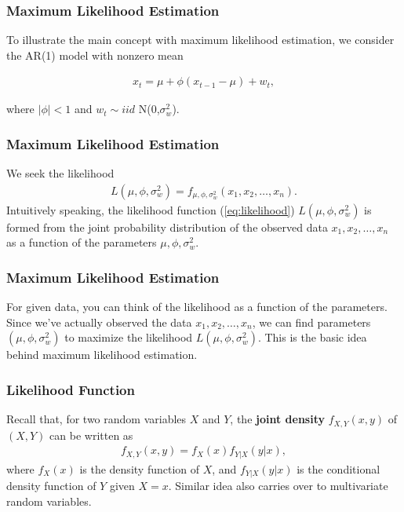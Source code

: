\documentclass[%
xcolor=pdftex]{beamer}
\begin{document}
\begin{frame}
\frametitle{Maximum Likelihood Estimation}

To illustrate the main concept with maximum likelihood estimation, we consider the AR(1) model with nonzero mean

\begin{eqnarray}\label{eq:ar1}
x_t=\mu+\phi(x_{t-1}-\mu)+w_t,
\end{eqnarray}

where $|\phi|<1$ and $w_t\sim iid $ N(0,$\sigma^2_w$).

\end{frame}

\begin{frame}
\frametitle{Maximum Likelihood Estimation}

We seek the likelihood
\begin{eqnarray}\label{eq:likelihood}
L(\mu,\phi,\sigma^2_w) = f_{\mu,\phi,\sigma^2_w}(x_1,x_2,\ldots,x_n).
\end{eqnarray}
Intuitively speaking, the likelihood function (\ref{eq:likelihood})
$L(\mu,\phi,\sigma^2_w)$ is formed from the joint probability distribution of the observed data $x_1,x_2,\ldots,x_n$ as a function of the parameters $\mu,\phi,\sigma^2_w$.

\end{frame}

\begin{frame}
\frametitle{Maximum Likelihood Estimation}

For given data, you can
think of the likelihood as a function of the parameters.
Since we've actually observed the data $x_1,x_2,\ldots,x_n$, we
can find parameters $(\mu,\phi,\sigma^2_w)$ to maximize the
likelihood $L(\mu,\phi,\sigma^2_w)$. This is the basic idea
behind maximum likelihood estimation.

\end{frame}


\begin{frame}
\frametitle{Likelihood Function}

Recall that, for two random variables $X$
and $Y$, the \textbf{joint density} $f_{X,Y}(x,y)$ of $(X,Y)$ can be
written as
\begin{eqnarray*}
f_{X,Y}(x,y)=f_X(x) f_{Y|X}(y|x),
\end{eqnarray*}
where $f_X(x)$ is the density function of $X$, and
$f_{Y|X}(y|x)$ is the conditional density function of $Y$ given
$X=x$. Similar idea also carries over to multivariate random
variables.

\end{frame}
\end{document}
